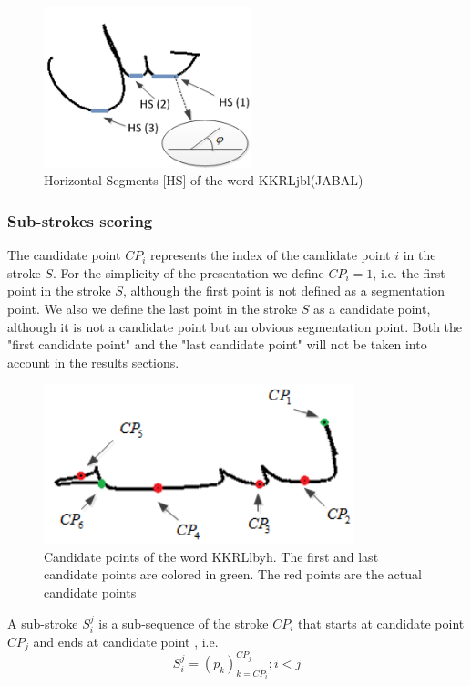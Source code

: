 \documentclass[12pt,journal,compsoc]{IEEEtran}
\begin{document}
\begin{figure}
\centering
\includegraphics[width=6cm]{./figures/horizontal_segments}
\caption{Horizontal Segments [HS] of the word KKRL{jbl}(JABAL)}
\label{fig:horizontal_segments}
\end{figure}

\subsubsection{Sub-strokes scoring}
The candidate point $CP_{i}$ represents the index of the candidate point $i$ in the stroke $S$. For the simplicity of the presentation we define $CP_{i}=1$, i.e. the first point in the stroke $S$, although the first point is not defined as a segmentation point. We also we define the last point in the stroke $S$ as a candidate point, although it is not a candidate point but an obvious segmentation point. Both the "first candidate point" and the "last candidate point" will not be taken into account in the results sections.   

\begin{figure}
\centering
\includegraphics[width=9cm]{./figures/candidate_points}
\caption{Candidate points of the word  KKRL{lbyh}. The first and last candidate points are colored in green. The red points are the actual candidate points}
\label{fig:candidate_points}
\end{figure}

A sub-stroke $S_{i}^{j}$ is a sub-sequence of the stroke $CP_{i}$ that starts at candidate point $CP_{j}$ and ends at candidate point , i.e.
\begin{equation}
S_{i}^{j}=(p_{k})_{k=CP_{i}}^{CP_{j}}; i<j
\end{equation}
\end{document}
